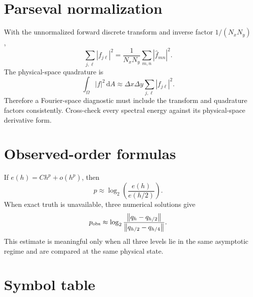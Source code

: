 \documentclass[11pt]{article}
\newcommand{\dd}{\mathrm{d}}
\newcommand{\norm}[1]{\left\lVert #1\right\rVert}
\begin{document}
\section{Parseval normalization}
\label{app:parseval}

With the unnormalized forward discrete transform and inverse factor $1/(N_xN_y)$,
\begin{equation}
\sum_{j,\ell}|f_{j\ell}|^2
=\frac{1}{N_xN_y}\sum_{m,n}|\widehat f_{mn}|^2.
\end{equation}
The physical-space quadrature is
\begin{equation}
\int_\Omega |f|^2\,\dd A
\approx\Delta x\Delta y\sum_{j,\ell}|f_{j\ell}|^2.
\end{equation}
Therefore a Fourier-space diagnostic must include the transform and quadrature factors consistently. Cross-check every spectral energy against its physical-space derivative form.

\section{Observed-order formulas}
\label{app:order}

If $e(h)=Ch^p+o(h^p)$, then
\begin{equation}
p\approx\log_2\left(\frac{e(h)}{e(h/2)}\right).
\end{equation}
When exact truth is unavailable, three numerical solutions give
\begin{equation}
p_{\rm obs}
\approx
\log_2
\frac{\norm{q_h-q_{h/2}}}
{\norm{q_{h/2}-q_{h/4}}}.
\end{equation}
This estimate is meaningful only when all three levels lie in the same asymptotic regime and are compared at the same physical state.

\section{Symbol table}
\label{app:symbols}
\end{document}
